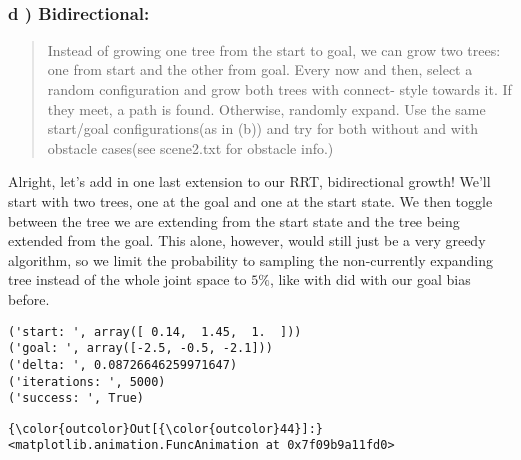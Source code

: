 \documentclass{article}
\begin{document}
    \begin{center}
    \end{center}
    { \hspace*{\fill} \\}
    

    \subsubsection{d ) Bidirectional:}


    \begin{quote}
Instead of growing one tree from the start to goal, we can grow two
trees: one from start and the other from goal. Every now and then,
select a random configuration and grow both trees with connect- style
towards it. If they meet, a path is found. Otherwise, randomly expand.
Use the same start/goal configurations(as in (b)) and try for both
without and with obstacle cases(see scene2.txt for obstacle info.)
\end{quote}

    Alright, let's add in one last extension to our RRT, bidirectional
growth! We'll start with two trees, one at the goal and one at the start
state. We then toggle between the tree we are extending from the start
state and the tree being extended from the goal. This alone, however,
would still just be a very greedy algorithm, so we limit the probability
to sampling the non-currently expanding tree instead of the whole joint
space to $5\%$, like with did with our goal bias before.



    \begin{Verbatim}[commandchars=\\\{\}]
('start: ', array([ 0.14,  1.45,  1.  ]))
('goal: ', array([-2.5, -0.5, -2.1]))
('delta: ', 0.08726646259971647)
('iterations: ', 5000)
('success: ', True)
    \end{Verbatim}




            \begin{Verbatim}[commandchars=\\\{\}]
{\color{outcolor}Out[{\color{outcolor}44}]:} <matplotlib.animation.FuncAnimation at 0x7f09b9a11fd0>
\end{Verbatim}
        
    \begin{center}
    \end{center}
    { \hspace*{\fill} \\}
    
\end{document}
